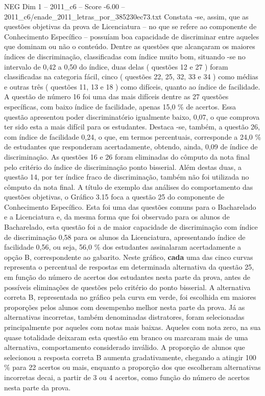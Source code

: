 \begin{textsample}{NEG Dim 1 – 2011\_c6 – Score -6.00 – 2011\_c6/enade\_2011\_letras\_por\_385230ec73.txt}
Constata -se, assim, que as questões objetivas da prova de Licenciatura – no que se refere ao componente de Conhecimento Específico – possuíam boa capacidade de discriminar entre aqueles que dominam ou não o conteúdo.
Dentre as questões que alcançaram os maiores índices de discriminação, classificadas com índice muito bom, situando -se no intervalo de 0,42 a 0,50 do índice, duas delas ( questões 12 e 27 ) foram classificadas na categoria fácil, cinco ( questões 22, 25, 32, 33 e 34 ) como médias e outras três ( questões 11, 13 e 18 ) como difíceis, quanto ao índice de facilidade.
A questão de número 16 foi uma das mais difíceis dentre as 27 questões específicas, com baixo índice de facilidade, apenas 15,0 \% de acertos.
Essa questão apresentou poder discriminatório igualmente baixo, 0,07, o que comprova ter sido esta a mais difícil para os estudantes.
Destaca -se, também, a questão 26, com índice de facilidade 0,24, o que, em termos percentuais, corresponde a 24,0 \% de estudantes que responderam acertadamente, obtendo, ainda, 0,09 de índice de discriminação.
As questões 16 e 26 foram eliminadas do cômputo da nota final pelo critério do índice de discriminação ponto bisserial.
Além destas duas, a questão 14, por ter índice fraco de discriminação, também não foi utilizada no cômputo da nota final.
A título de exemplo das análises do comportamento das questões objetivas, o Gráfico 3.15 foca a questão 25 do componente de Conhecimento Específico.
Esta foi uma das questões comuns para o Bacharelado e a Licenciatura e, da mesma forma que foi observado para os alunos de Bacharelado, esta questão foi a de maior capacidade de discriminação com índice de discriminação 0,58 para os alunos da Licenciatura, apresentando índice de facilidade 0,56, ou seja, 56,0 \% dos estudantes assinalaram acertadamente a opção B, correspondente ao gabarito.
Neste gráfico, \textbf{cada} uma das cinco curvas representa o percentual de respostas em determinada alternativa da questão 25, em função do número de acertos dos estudantes nesta parte da prova, antes de possíveis eliminações de questões pelo critério do ponto bisserial.
A alternativa correta B, representada no gráfico pela curva em verde, foi escolhida em maiores proporções pelos alunos com desempenho melhor nesta parte da prova.
Já as alternativas incorretas, também denominadas distratores, foram selecionadas principalmente por aqueles com notas mais baixas.
Aqueles com nota zero, na sua quase totalidade deixaram esta questão em branco ou marcaram mais de uma alternativa, comportamento considerado inválido.
A proporção de alunos que selecionou a resposta correta B aumenta gradativamente, chegando a atingir 100 \% para 22 acertos ou mais, enquanto a proporção dos que escolheram alternativas incorretas decai, a partir de 3 ou 4 acertos, como função do número de acertos nesta parte da prova.

\end{textsample}

